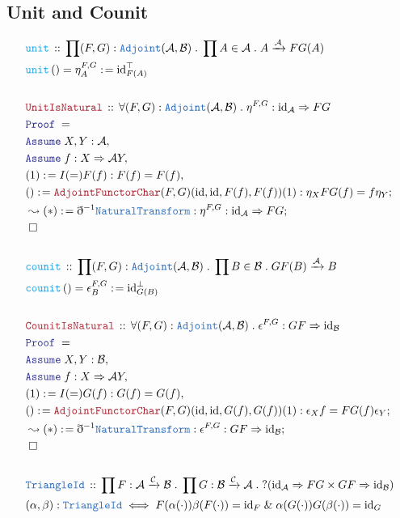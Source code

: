 \documentclass[12pt]{scrartcl}
\newcommand{\TYPE}[1]{\textcolor{NavyBlue}{\mathtt{#1}}}
\newcommand{\FUNC}[1]{\textcolor{Cerulean}{\mathtt{#1}}}
\newcommand{\LOGIC}[1]{\textcolor{Blue}{\mathtt{#1}}}
\newcommand{\THM}[1]{\textcolor{Maroon}{\mathtt{#1}}}
\renewcommand{\.}{\; . \;}
\newcommand{\de}{: \kern 0.1pc =}
\newcommand{\Act}[1]{\left( #1 \right)}
\newcommand{\Theorem}[2]{& \THM{#1} \, :: \, #2 \\ & \Proof = \\ }
\newcommand{\DeclareType}[2]{& \TYPE{#1} \, :: \, #2 \\}
\newcommand{\DefineType}[3]{& #1 : \TYPE{#2} \iff #3 \\}
\newcommand{\DeclareFunc}[2]{& \FUNC{#1} \, :: \, #2 \\}
\newcommand{\DefineNamedFunc}[4]{&  \FUNC{#1}\Act{#2} = #3 \de #4 \\}
\newcommand{\Page}[1]{ \begin{align*} #1 \end{align*}   }
\newcommand{ \bd }{ \ByDef }
\renewcommand{\And}{\; \& \;}
\DeclareMathOperator*{\id}{id}
\newcommand{\Arrow}{\xrightarrow}
\newcommand{\Say}[3]{& #1 \de #2 : #3, \\}
\newcommand{\Conclude}[3]{& #1 \de #2 : #3; \\}
\newcommand{\DeriveConclude}[3]{& \leadsto #1 \de #2 : #3 ; \\}
\newcommand{\Assume}[2]{& \LOGIC{Assume} \; #1 : #2, \\}
\newcommand{\QED}{\; \square}
\newcommand{\EndProof}{& \QED \\}
\newcommand{\ByDef}{\eth}
\newcommand{\Proof}{\LOGIC{Proof} \; }
\newcommand{\NT}{\TYPE{NaturalTransform}}
\newcommand{\C}{\mathcal{C}}
\newcommand{\A}{\mathcal{A}}
\newcommand{\B}{\mathcal{B}}
\begin{document}
\subsection{Unit and Counit}
\Page{
	\DeclareFunc{unit}{ \prod (F,G) : \TYPE{Adjoint}(\A,\B) \. \prod A \in \A \. A \Arrow{\A} FG(A)}
	\DefineNamedFunc{unit}{}{\eta_A^{F,G}}{{\id}^\top_{F(A)}}
	\\
	\Theorem{UnitIsNatural}{\forall (F,G) : \TYPE{Adjoint}(\A,\B) \. \eta^{F,G} : {\id}_\A \Rightarrow FG}
	\Assume{X,Y}{\A}
	\Assume{f}{X \Rightarrow{\A} Y}
	\Say{(1)}{I(=)F(f)}{F(f) = F(f)}
	\Conclude{()}{\THM{AdjointFunctorChar}(F,G)(\id,\id,F(f),F(f))(1)}
	{  	\eta_X FG(f)  =  f \eta_Y
	}
	\DeriveConclude{(*)}{\bd^{-1} \NT}{ \eta^{F,G} : {\id}_\A \Rightarrow FG}
	\EndProof
	\\
	\DeclareFunc{counit}{ \prod (F,G) : \TYPE{Adjoint}(\A,\B) \. \prod B \in \B \. GF(B) \Arrow{\A} B}
	\DefineNamedFunc{counit}{}{\epsilon_B^{F,G}}{{\id}^\bot_{G(B)}}
	\\
	\Theorem{CounitIsNatural}{\forall (F,G) : \TYPE{Adjoint}(\A,\B) \. \epsilon^{F,G} : GF \Rightarrow {\id}_\B}
	\Assume{X,Y}{\B}
	\Assume{f}{X \Rightarrow{\A} Y}
	\Say{(1)}{I(=)G(f)}{G(f) = G(f)}
	\Conclude{()}{\THM{AdjointFunctorChar}(F,G)(\id,\id,G(f),G(f))(1)}
	{  	\epsilon_X f  =  FG(f) \epsilon_Y
	}
	\DeriveConclude{(*)}{\bd^{-1} \NT}{ \epsilon^{F,G} : GF \Rightarrow {\id}_\B}
	\EndProof
	\\
	\DeclareType{TriangleId}{\prod F : \A \Arrow{\C} \B \. \prod G : \B \Arrow{\C} \A \. 
		?({\id}_\A \Rightarrow  FG \times GF \Rightarrow {\id}_\B)  }
	\DefineType{(\alpha,\beta)}{TriangleId}
	{F(\alpha(\cdot)) \beta(F(\cdot)) = {\id}_F \And   \alpha( G(\cdot))G(\beta(\cdot))  = {\id}_G}
}
\newpage
\end{document}
